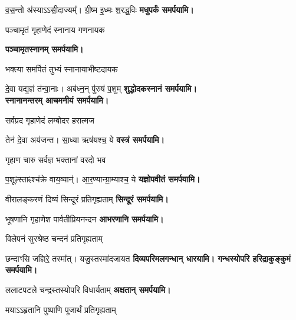 \begin{center}
{व॒स॒न्तो अ॑स्याऽऽसी॒दाज्यम्᳚। ग्री॒ष्म इ॒ध्मः श॒रद्ध॒विः}
\textbf{\devAya{} मधुपर्कं समर्पयामि।}
\medskip

{पञ्चामृतं गृहाणेदं स्नानाय गणनायक}

\textbf{\devAya{} पञ्चामृतस्नानम् समर्पयामि।}
\medskip

{भक्त्या समर्पितं तुभ्यं स्नानायाभीष्टदायक}

{दे॒वा यद्य॒ज्ञं त॑न्वा॒नाः। अब॑ध्न॒न् पु॑रुषं प॒शुम्}
\textbf{\devAya{} शुद्धोदकस्नानं समर्पयामि।\\
स्नानानन्तरम् आचमनीयं समर्पयामि।}
\medskip

{सर्वप्रद गृहाणेदं लम्बोदर हरात्मज}

{तेन॑ दे॒वा अय॑जन्त। सा॒ध्या ऋष॑यश्च॒ ये}
\textbf{\devAya{} वस्त्रं समर्पयामि।}
\medskip

{गृहाण चारु सर्वज्ञ भक्तानां वरदो भव}

{प॒शूꣴस्ताꣴश्च॑क्रे वाय॒व्यान्॑। आ॒र॒ण्यान्ग्रा॒म्याश्च॒ ये}
\textbf{\devAya{} यज्ञोपवीतं समर्पयामि।}
\medskip

{वीरालङ्करणं दिव्यं सिन्दूरं प्रतिगृह्यताम्}
\textbf{\devAya{} सिन्दूरं समर्पयामि।}
\medskip

{भूषणानि गृहाणेश पार्वतीप्रियनन्दन}
\textbf{\devAya{} आभरणानि समर्पयामि।}
\medskip

{विलेपनं सुरश्रेष्ठ चन्दनं प्रतिगृह्यताम्}

{छन्दाꣳसि जज्ञिरे॒ तस्मा᳚त्। यजु॒स्तस्मा॑दजायत}
\textbf{\devAya{} दिव्यपरिमलगन्धान् धारयामि। गन्धस्योपरि हरिद्राकुङ्कुमं समर्पयामि।}
\medskip

{ललाटपटले चन्द्रस्तस्योपरि विधार्यताम्}
\textbf{\devAya{} अक्षतान् समर्पयामि।}
\medskip

{मयाऽऽहृतानि पुष्पाणि पूजार्थं प्रतिगृह्यताम्}


\end{center}
